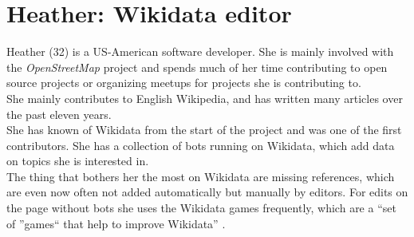 \section{Heather: Wikidata editor}
Heather (32) is a US-American software developer. She is mainly involved with the \textit{OpenStreetMap} project and spends much of her time contributing to open source projects or organizing meetups for projects she is contributing to. \\
She mainly contributes to English Wikipedia, and has written many articles over the past eleven years. \\
She has known of Wikidata from the start of the project and was one of the first contributors. She has a collection of bots running on Wikidata, which add data on topics she is interested in. \\
The thing that bothers her the most on Wikidata are missing references, which are even now often not added automatically but manually by editors. For edits on the page without bots she uses the Wikidata games frequently, which are a ``set of ''games`` that help to improve Wikidata'' \citep{wikidatagame}.
